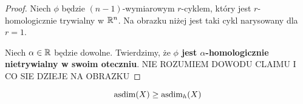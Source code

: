 \begin{proof}
  Niech $\phi$ będzie $(n-1)$-wymiarowym $r$-cyklem, który jest $r$-homologicznie trywialny w $\mathbb{R}^n$. Na obrazku niżej jest taki cykl narysowany dla $r=1$.
  \begin{center}
  \end{center}

  Niech $\alpha\in\mathbb{R}$ będzie dowolne. Twierdzimy, że \textbf{$\phi$ jest $\alpha$-homologicznie nietrywialny w swoim oteczniu}.
  {\large\color{red}NIE ROZUMIEM DOWODU CLAIMU I CO SIE DZIEJE NA OBRAZKU}
\end{proof}
%

\begin{theorem}{}{}
  $$\operatorname{asdim}(X)\geq\operatorname{asdim}_h(X)$$
\end{theorem}

